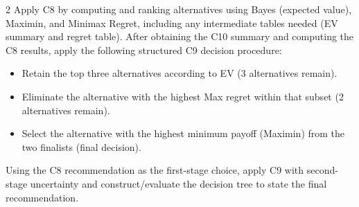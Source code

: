 \documentclass[12pt]{article}
\begin{document}
\begin{multicols}{2}
		Apply C8 by computing and ranking alternatives using Bayes (expected value), Maximin, and Minimax Regret, including any intermediate tables needed (EV summary and regret table).
		After obtaining the C10 summary and computing the C8 results, apply the following structured C9 decision procedure:
		\begin{itemize}
			\item Retain the top three alternatives according to EV (3 alternatives remain).
			\item Eliminate the alternative with the highest Max regret within that subset (2 alternatives remain).
			\item Select the alternative with the highest minimum payoff (Maximin) from the two finalists (final decision).
		\end{itemize}
		Using the C8 recommendation as the first-stage choice, apply C9 with second-stage uncertainty and construct/evaluate the decision tree to state the final recommendation.

	\end{multicols}
	
\end{document}
